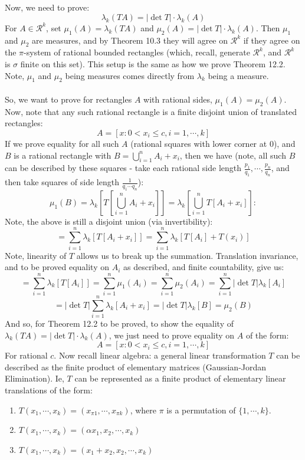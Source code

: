 \documentclass[12pt,a4paper]{article}
\newcommand{\1}[1]{\mathbbm{1}\left\{ #1 \right\}}
\newcommand{\rcal}{\mathcal{R}}
\begin{document}
\\\\
Now, we need to prove:
$$
	\lambda_k(TA) = |\det T| \cdot \lambda_k(A)
$$
For $A \in \rcal^k$, set $\mu_1(A) = \lambda_k(TA)$ and $\mu_2(A) = |\det T| \cdot \lambda_k(A)$. Then $\mu_1$ and $\mu_2$ are measures, and by Theorem 10.3 they will agree on $\rcal^k$ if they agree on the $\pi$-system of rational bounded rectangles (which, recall, generate $\rcal^k$, and $\rcal^k$ is $\sigma$ finite on this set). This setup is the same as how we prove Theorem 12.2. Note, $\mu_1$ and $\mu_2$ being measures comes directly from $\lambda_k$ being a measure.
\\\\
So, we want to prove for rectangles $A$ with rational sides, $\mu_1(A) = \mu_2(A)$. Now, note that any such rational rectangle is a finite disjoint union of translated rectangles:
$$
	A = [x: 0 < x_i \leq c, i = 1, \cdots, k]
$$
If we prove equality for all such $A$ (rational squares with lower corner at $0$), and $B$ is a rational rectangle with $B = \bigcup_{i=1}^n A_i + x_i$, then we have (note, all such $B$ can be described by these squares - take each rational side length $\frac{p_1}{q_1}, \cdots, \frac{p_n}{q_n}$, and then take squares of side length $\frac{1}{q_1 \cdots q_n}$):
$$
	\mu_1(B) = \lambda_k\left[T\left[\bigcup_{i=1}^n A_i + x_i\right]\right] =
	\lambda_k\left[\bigcup_{i=1}^n T\left[A_i + x_i\right]\right]:
$$
Note, the above is still a disjoint union (via invertibility):
$$
	= \sum_{i=1}^n \lambda_k\left[T\left[A_i + x_i\right]\right]
	= \sum_{i=1}^n \lambda_k\left[T\left[A_i\right] + T(x_i)\right]
$$
Note, linearity of $T$ allows us to break up the summation. Translation invariance, and to be proved equality on $A_i$ as described, and finite countability, give us:
$$
	= \sum_{i=1}^n \lambda_k\left[T\left[A_i\right]\right]
	= \sum_{i=1}^n \mu_1(A_i)
	= \sum_{i=1}^n \mu_2(A_i)
	= \sum_{i=1}^n |\det T|\lambda_k\left[A_i\right]
$$
$$
	= |\det T| \sum_{i=1}^n \lambda_k\left[A_i + x_i\right]
	= |\det T| \lambda_k\left[B\right] = \mu_2(B)
$$
And so, for Theorem 12.2 to be proved, to show the equality of $\lambda_k(TA) = |\det T| \cdot \lambda_k(A)$, we just need to prove equality on $A$ of the form:
$$
	A = [x: 0 < x_i \leq c, i = 1, \cdots, k]
$$
For rational $c$. Now recall linear algebra: a general linear transformation $T$ can be described as the finite product of elementary matrices (Gaussian-Jordan Elimination). Ie, $T$ can be represented as a finite product of elementary linear translations of the form:
\begin{enumerate}
	\item $T(x_1, \cdots, x_k) = (x_{\pi 1}, \cdots, x_{\pi k})$, where $\pi$ is a permutation of $\{1, \cdots, k\}$.
	\item $T(x_1, \cdots, x_k) = (\alpha x_1, x_2, \cdots, x_k)$
	\item $T(x_1, \cdots, x_k) = (x_1 + x_2, x_2, \cdots, x_k)$
\end{enumerate}
\end{document}
